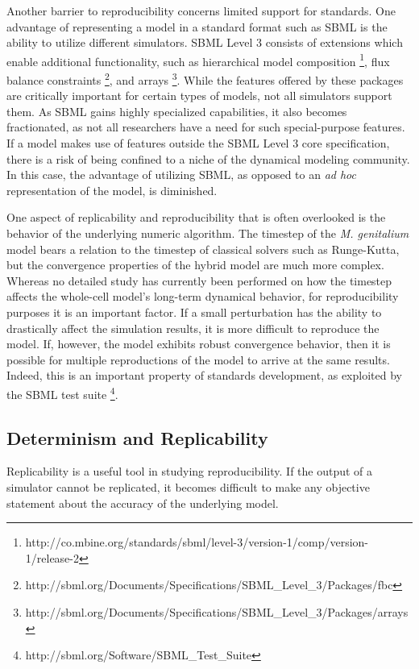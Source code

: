 \documentclass[journal,transmag,twoside]{IEEEtran}
\begin{document}
Another barrier to reproducibility concerns limited support for standards.
One advantage of representing a model in a standard format such as SBML is the ability
to utilize different simulators.
SBML Level 3 consists of extensions which enable additional
functionality, such as
hierarchical model composition \footnote{http://co.mbine.org/standards/sbml/level-3/version-1/comp/version-1/release-2},
flux balance constraints \footnote{ http://sbml.org/Documents/Specifications/SBML\_Level\_3/Packages/fbc}, and
arrays \footnote{http://sbml.org/Documents/Specifications/SBML\_Level\_3/Packages/arrays}.
While the features offered by these packages are critically important for certain
types of models, not all simulators support them.
As SBML gains highly specialized capabilities, it also becomes fractionated, as
not all researchers have a need for such special-purpose features.
If a model makes use of features outside the SBML Level 3 core specification,
there is a risk of being confined to a niche of the dynamical modeling community.
In this case, the advantage of utilizing SBML, as opposed to an \textit{ad hoc} representation
of the model, is diminished.

One aspect of replicability and reproducibility that is often overlooked is the
behavior of the underlying numeric algorithm.
The timestep of the \textit{M. genitalium} model bears a relation to the timestep
of classical solvers such as Runge-Kutta, but the convergence properties of the hybrid model
are much more complex.
Whereas no detailed study has currently been performed on how the timestep affects
the whole-cell model's long-term dynamical behavior, for reproducibility purposes it is
an important factor. If a small perturbation has the ability to drastically
affect the simulation results, it is more difficult to reproduce the model.
If, however, the model exhibits robust convergence behavior, then it is
possible for multiple reproductions of the model to arrive at the same results.
Indeed, this is an important property of standards development, as exploited by
the SBML test suite \footnote{http://sbml.org/Software/SBML\_Test\_Suite}.

\subsection{Determinism and Replicability}

Replicability is a useful tool in studying reproducibility.
If the output of a simulator cannot be replicated, it becomes
difficult to make any objective statement about the accuracy of the
underlying model.
\end{document}
